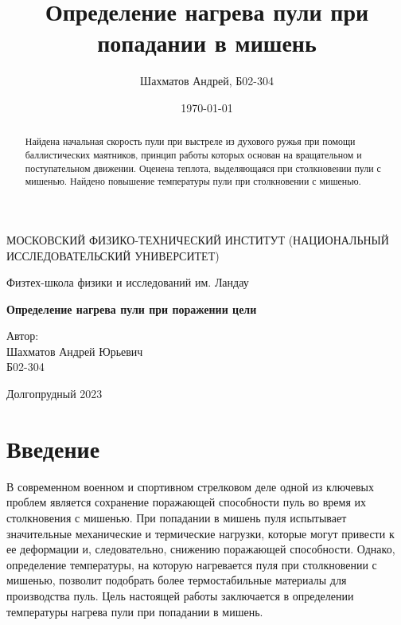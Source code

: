\documentclass[12pt]{article}
\title{Определение нагрева пули при попадании в мишень}
\author{Шахматов Андрей, Б02-304}
\date{\today}
\begin{document}
\begin{titlepage}
    \begin{center}
        {\large МОСКОВСКИЙ ФИЗИКО-ТЕХНИЧЕСКИЙ ИНСТИТУТ (НАЦИОНАЛЬНЫЙ ИССЛЕДОВАТЕЛЬСКИЙ УНИВЕРСИТЕТ)}
    \end{center}
    \begin{center}
        {\large Физтех-школа физики и исследований им. Ландау}
    \end{center}
    
    
    \vspace{3cm}
    {\huge
        \begin{center}
            \textbf{Определение нагрева пули при поражении цели}
        \end{center}
    }
    \vspace{2cm}
    \begin{flushright}
        {\LARGE Автор:\\ Шахматов Андрей Юрьевич \\
            \vspace{0.2cm}
            Б02-304}
    \end{flushright}
    \vspace{7 cm}
    \begin{center}
        Долгопрудный 2023
    \end{center}
\end{titlepage}


\begin{abstract}
    Найдена начальная скорость пули при выстреле из духового ружья при помощи баллистических маятников, 
    принцип работы которых основан на вращательном и поступательном движении. Оценена теплота, выделяющаяся при столкновении пули с мишенью. 
    Найдено повышение температуры пули при столкновении с мишенью.
\end{abstract}

\tableofcontents

\section{Введение}
В современном военном и спортивном стрелковом деле одной из ключевых проблем является сохранение поражающей способности пуль 
во время их столкновения с мишенью. При попадании в мишень пуля испытывает значительные механические и термические нагрузки, 
которые могут привести к ее деформации и, следовательно, снижению поражающей способности. Однако, определение температуры, 
на которую нагревается пуля при столкновении с мишенью, позволит подобрать более термостабильные материалы для производства пуль.
Цель настоящей работы заключается в определении температуры нагрева пули при попадании в мишень.
\end{document}
